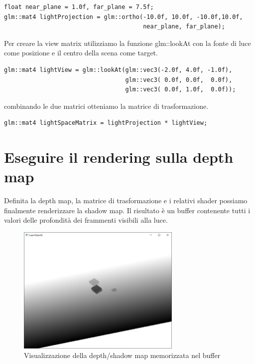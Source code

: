 \documentclass[12pt]{report}
\begin{document}
\begin{verbatim}
float near_plane = 1.0f, far_plane = 7.5f;
glm::mat4 lightProjection = glm::ortho(-10.0f, 10.0f, -10.0f,10.0f, 
                                       near_plane, far_plane);
\end{verbatim}

Per creare la view matrix utilizziamo la funzione glm::lookAt con la fonte di luce come posizione e il centro della scena come target.

\begin{verbatim}
glm::mat4 lightView = glm::lookAt(glm::vec3(-2.0f, 4.0f, -1.0f), 
                                  glm::vec3( 0.0f, 0.0f,  0.0f), 
                                  glm::vec3( 0.0f, 1.0f,  0.0f));  
\end{verbatim}

combinando le due matrici otteniamo la matrice di trasformazione.

\begin{verbatim}
glm::mat4 lightSpaceMatrix = lightProjection * lightView; 
\end{verbatim}

\section{Eseguire il rendering sulla depth map}
Definita la depth map, la matrice di trasformazione e i relativi shader possiamo finalmente renderizzare la shadow map. Il risultato è un buffer contenente tutti i valori delle profondità dei frammenti visibili alla luce.

\begin{figure}[H]
    \centering
    \includegraphics[width=0.7\textwidth]{img/shadow_mapping_depth_map.png}
    \caption{Visualizzazione della depth/shadow map memorizzata nel buffer}
\end{figure}
\end{document}
